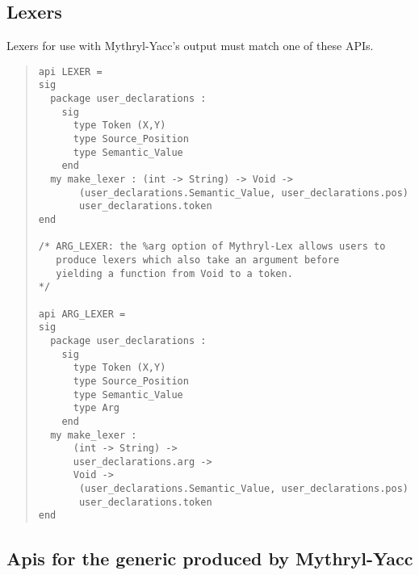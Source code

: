 \subsection{Lexers}

Lexers for use with Mythryl-Yacc's output must match one of these APIs.

\begin{quote}
\begin{verbatim}
api LEXER =
sig
  package user_declarations :
    sig
      type Token (X,Y)
      type Source_Position
      type Semantic_Value
    end
  my make_lexer : (int -> String) -> Void -> 
       (user_declarations.Semantic_Value, user_declarations.pos)
       user_declarations.token
end

/* ARG_LEXER: the %arg option of Mythryl-Lex allows users to
   produce lexers which also take an argument before
   yielding a function from Void to a token.
*/

api ARG_LEXER =
sig
  package user_declarations :
    sig
      type Token (X,Y)
      type Source_Position
      type Semantic_Value
      type Arg
    end
  my make_lexer :
      (int -> String) ->
      user_declarations.arg ->
      Void -> 
       (user_declarations.Semantic_Value, user_declarations.pos)
       user_declarations.token
end
\end{verbatim}
\end{quote}

\subsection{Apis for the generic produced by Mythryl-Yacc}

